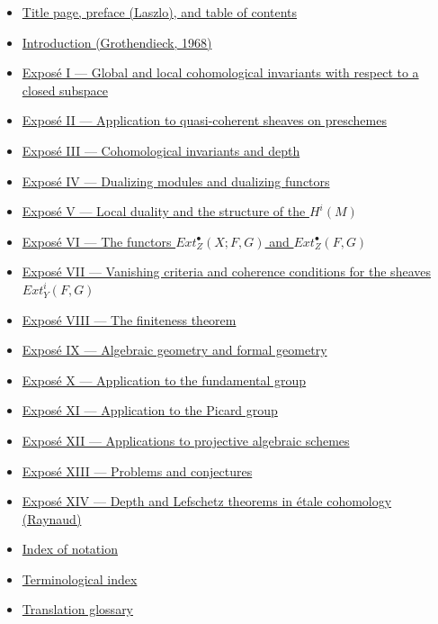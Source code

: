 \documentclass[
]{article}
\providecommand{\tightlist}{%
  \setlength{\itemsep}{0pt}\setlength{\parskip}{0pt}}
\begin{document}
\begin{itemize}
\tightlist
\item
  \href{00-title-preface.md}{Title page, preface (Laszlo), and table of
  contents}
\item
  \href{00-introduction.md}{Introduction (Grothendieck, 1968)}
\item
  \href{01-invariants-cohomologiques.md}{Exposé I --- Global and local
  cohomological invariants with respect to a closed subspace}
\item
  \href{02-faisceaux-quasi-coherents.md}{Exposé II --- Application to
  quasi-coherent sheaves on preschemes}
\item
  \href{03-invariants-cohomologiques-et-profondeur.md}{Exposé III ---
  Cohomological invariants and depth}
\item
  \href{04-modules-et-foncteurs-dualisants.md}{Exposé IV --- Dualizing
  modules and dualizing functors}
\item
  \href{05-dualite-locale-et-structure-des-Hi.md}{Exposé V --- Local
  duality and the structure of the \(H^{i}(M)\)}
\item
  \href{06-foncteurs-Ext.md}{Exposé VI --- The functors
  \(Ext^{\bullet}_{Z}(X; F, G)\) and \(Ext^{\bullet}_{Z}(F, G)\)}
\item
  \href{07-criteres-de-nullite-coherence.md}{Exposé VII --- Vanishing
  criteria and coherence conditions for the sheaves
  \(Ext^{i}_{Y}(F, G)\)}
\item
  \href{08-theoreme-de-finitude.md}{Exposé VIII --- The finiteness
  theorem}
\item
  \href{09-geometrie-algebrique-et-formelle.md}{Exposé IX --- Algebraic
  geometry and formal geometry}
\item
  \href{10-application-au-groupe-fondamental.md}{Exposé X ---
  Application to the fundamental group}
\item
  \href{11-application-au-groupe-de-picard.md}{Exposé XI --- Application
  to the Picard group}
\item
  \href{12-schemas-algebriques-projectifs.md}{Exposé XII ---
  Applications to projective algebraic schemes}
\item
  \href{13-problemes-et-conjectures.md}{Exposé XIII --- Problems and
  conjectures}
\item
  \href{14-profondeur-lefschetz-cohomologie-etale.md}{Exposé XIV ---
  Depth and Lefschetz theorems in étale cohomology (Raynaud)}
\item
  \href{zz-index-notations.md}{Index of notation}
\item
  \href{zz-index-terminologique.md}{Terminological index}
\item
  \href{glossary.md}{Translation glossary}
\end{itemize}
\end{document}
